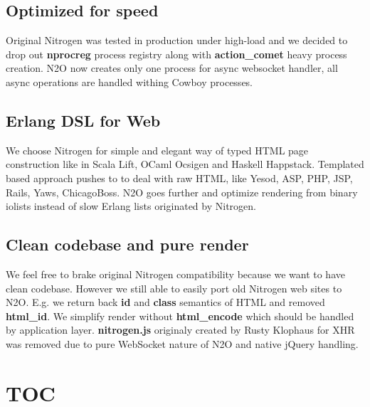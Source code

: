 \documentclass[11pt]{article}
\begin{document}
\subsection*{Optimized for speed}
Original Nitrogen was tested in production under high-load and we decided to drop out
{\bf nprocreg} process registry along with {\bf action_comet} heavy process creation. N2O now creates
only one process for async websocket handler, all async operations are handled withing
Cowboy processes.

\subsection*{Erlang DSL for Web}
We choose Nitrogen for simple and elegant way of typed HTML page construction like 
in Scala Lift, OCaml Ocsigen and Haskell Happstack.
Templated based approach pushes to to deal with raw HTML, like 
Yesod, ASP, PHP, JSP, Rails, Yaws, ChicagoBoss.
N2O goes further and optimize rendering from binary iolists instead of slow Erlang
lists originated by Nitrogen.


\subsection*{Clean codebase and pure render}
We feel free to brake original Nitrogen compatibility because we want to have clean codebase.
However we still able to easily port old Nitrogen web sites to N2O. 
E.g. we return back {\bf id} and {\bf class} semantics of HTML and removed {\bf html_id}.
We simplify render without {\bf html_encode} which should be handled by application layer.
{\bf nitrogen.js} originaly created by Rusty Klophaus for XHR was removed due to pure
WebSocket nature of N2O and native jQuery handling.




\section*{TOC}
\paragraph{}
 \@br
{} \@br
{} \@br
{} \@br
{} \@br

\end{document}
